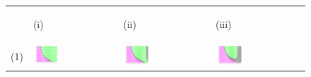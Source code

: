 \documentclass[12pt]{UOthesis}
\theoremstyle{remarkstyle}
\begin{document}
\begin{figure}[h!]
	\centering
	\begin{tabular}{m{0.07cm} m{4.5cm}  m{4.5cm}  m{4.5cm}}
		& \begin{center}
			(i)
		\end{center} & \begin{center}
			(ii)
		\end{center} & \begin{center}
			(iii)
		\end{center}\\
		(1) & \includegraphics[width=0.33\textwidth]{HLOOwlSimpSSMutualInvasionOnSteadyState1.png} & \includegraphics[width=0.33\textwidth]{HLOOwlSimpSSMutualInvasionOnSteadyState2.png} & \includegraphics[width=0.33\textwidth]{HLOOwlSimpSSMutualInvasionOnSteadyState3.png}\\
		

\end{tabular}
\end{figure}
\end{document}
